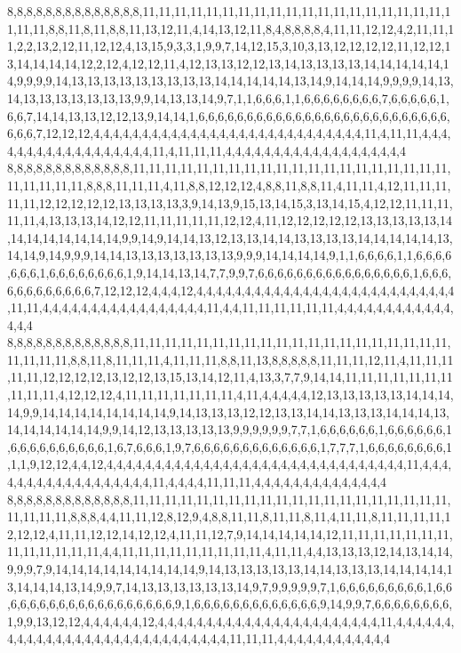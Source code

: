 8,8,8,8,8,8,8,8,8,8,8,8,8,8,11,11,11,11,11,11,11,11,11,11,11,11,11,11,11,11,11,11,11,11,11,11,8,8,11,8,11,8,8,11,13,12,11,4,14,13,12,11,8,4,8,8,8,8,4,11,11,12,12,4,2,11,11,11,2,2,13,2,12,11,12,12,4,13,15,9,3,3,1,9,9,7,14,12,15,3,10,3,13,12,12,12,12,11,12,12,13,14,14,14,14,12,2,12,4,12,12,11,4,12,13,13,12,12,13,14,13,13,13,13,14,14,14,14,14,14,9,9,9,9,14,13,13,13,13,13,13,13,13,13,14,14,14,14,14,13,14,9,14,14,14,9,9,9,9,14,13,14,13,13,13,13,13,13,13,9,9,14,13,13,14,9,7,1,1,6,6,6,1,1,6,6,6,6,6,6,6,6,7,6,6,6,6,6,1,6,6,7,14,14,13,13,12,12,13,9,14,14,1,6,6,6,6,6,6,6,6,6,6,6,6,6,6,6,6,6,6,6,6,6,6,6,6,6,6,6,6,6,7,12,12,12,4,4,4,4,4,4,4,4,4,4,4,4,4,4,4,4,4,4,4,4,4,4,4,4,4,4,4,4,11,4,11,11,4,4,4,4,4,4,4,4,4,4,4,4,4,4,4,4,4,4,11,4,11,11,11,4,4,4,4,4,4,4,4,4,4,4,4,4,4,4,4,4,4,4
8,8,8,8,8,8,8,8,8,8,8,8,8,11,11,11,11,11,11,11,11,11,11,11,11,11,11,11,11,11,11,11,11,11,11,11,11,11,8,8,8,11,11,11,4,11,8,8,12,12,12,4,8,8,11,8,8,11,4,11,11,4,12,11,11,11,11,11,12,12,12,12,12,13,13,13,13,3,9,14,13,9,15,13,14,15,3,13,14,15,4,12,12,11,11,11,11,11,4,13,13,13,14,12,12,11,11,11,11,11,12,12,4,11,12,12,12,12,12,13,13,13,13,13,14,14,14,14,14,14,14,14,9,9,14,9,14,14,13,12,13,13,14,14,13,13,13,13,14,14,14,14,14,13,14,14,9,14,9,9,9,14,14,13,13,13,13,13,13,13,9,9,9,14,14,14,14,9,1,1,6,6,6,6,1,1,6,6,6,6,6,6,6,1,6,6,6,6,6,6,6,6,1,9,14,14,13,14,7,7,9,9,7,6,6,6,6,6,6,6,6,6,6,6,6,6,6,6,6,1,6,6,6,6,6,6,6,6,6,6,6,6,7,12,12,12,4,4,4,12,4,4,4,4,4,4,4,4,4,4,4,4,4,4,4,4,4,4,4,4,4,4,4,4,4,4,4,11,11,4,4,4,4,4,4,4,4,4,4,4,4,4,4,4,4,4,11,4,4,11,11,11,11,11,11,4,4,4,4,4,4,4,4,4,4,4,4,4,4,4
8,8,8,8,8,8,8,8,8,8,8,8,8,11,11,11,11,11,11,11,11,11,11,11,11,11,11,11,11,11,11,11,11,11,11,11,11,8,8,11,8,11,11,11,4,11,11,11,8,8,11,13,8,8,8,8,8,11,11,11,12,11,4,11,11,11,11,11,12,12,12,12,13,12,12,13,15,13,14,12,11,4,13,3,7,7,9,14,14,11,11,11,11,11,11,11,11,11,11,4,12,12,12,4,11,11,11,11,11,11,11,4,11,4,4,4,4,4,12,13,13,13,13,13,14,14,14,14,9,9,14,14,14,14,14,14,14,14,9,14,13,13,13,12,12,13,13,14,14,13,13,13,14,14,14,13,14,14,14,14,14,14,9,9,14,12,13,13,13,13,13,9,9,9,9,9,9,7,7,1,6,6,6,6,6,6,1,6,6,6,6,6,6,1,6,6,6,6,6,6,6,6,6,6,1,6,7,6,6,6,1,9,7,6,6,6,6,6,6,6,6,6,6,6,6,6,1,7,7,7,1,6,6,6,6,6,6,6,6,1,1,1,9,12,12,4,4,12,4,4,4,4,4,4,4,4,4,4,4,4,4,4,4,4,4,4,4,4,4,4,4,4,4,4,4,4,4,4,4,11,4,4,4,4,4,4,4,4,4,4,4,4,4,4,4,4,4,4,11,4,4,4,4,11,11,11,4,4,4,4,4,4,4,4,4,4,4,4,4,4
8,8,8,8,8,8,8,8,8,8,8,8,8,11,11,11,11,11,11,11,11,11,11,11,11,11,11,11,11,11,11,11,11,11,11,11,11,8,8,8,4,4,11,11,12,8,12,9,4,8,8,11,11,8,11,11,8,11,4,11,11,8,11,11,11,11,12,12,12,4,11,11,12,12,14,12,12,4,11,11,12,7,9,14,14,14,14,14,12,11,11,11,11,11,11,11,11,11,11,11,11,11,4,4,11,11,11,11,11,11,11,11,11,4,11,11,4,4,13,13,13,12,14,13,14,14,9,9,9,7,9,14,14,14,14,14,14,14,14,14,9,14,13,13,13,13,13,14,14,13,13,13,14,14,14,14,13,14,14,14,13,14,9,9,7,14,13,13,13,13,13,13,14,9,7,9,9,9,9,9,7,1,6,6,6,6,6,6,6,6,6,1,6,6,6,6,6,6,6,6,6,6,6,6,6,6,6,6,6,6,6,9,1,6,6,6,6,6,6,6,6,6,6,6,6,6,9,14,9,9,7,6,6,6,6,6,6,6,6,1,9,9,13,12,12,4,4,4,4,4,4,12,4,4,4,4,4,4,4,4,4,4,4,4,4,4,4,4,4,4,4,4,4,4,4,11,4,4,4,4,4,4,4,4,4,4,4,4,4,4,4,4,4,4,4,4,4,4,4,4,4,4,4,4,4,11,11,11,4,4,4,4,4,4,4,4,4,4,4,4
